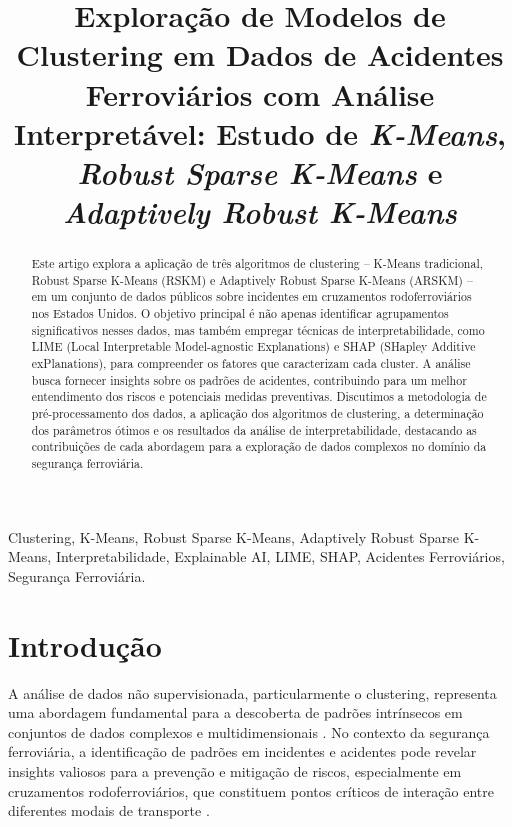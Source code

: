 \documentclass[conference]{IEEEtran}
\begin{document}
\title{Exploração de Modelos de Clustering em Dados de Acidentes Ferroviários com Análise Interpretável: Estudo de \textit{K-Means}, \textit{Robust Sparse K-Means} e \textit{Adaptively Robust K-Means}}

\author{
}

\maketitle

\begin{abstract}
Este artigo explora a aplicação de três algoritmos de clustering – K-Means tradicional, Robust Sparse K-Means (RSKM) e Adaptively Robust Sparse K-Means (ARSKM) – em um conjunto de dados públicos sobre incidentes em cruzamentos rodoferroviários nos Estados Unidos. O objetivo principal é não apenas identificar agrupamentos significativos nesses dados, mas também empregar técnicas de interpretabilidade, como LIME (Local Interpretable Model-agnostic Explanations) e SHAP (SHapley Additive exPlanations), para compreender os fatores que caracterizam cada cluster. A análise busca fornecer insights sobre os padrões de acidentes, contribuindo para um melhor entendimento dos riscos e potenciais medidas preventivas. Discutimos a metodologia de pré-processamento dos dados, a aplicação dos algoritmos de clustering, a determinação dos parâmetros ótimos e os resultados da análise de interpretabilidade, destacando as contribuições de cada abordagem para a exploração de dados complexos no domínio da segurança ferroviária.
\end{abstract}

\begin{IEEEkeywords}
Clustering, K-Means, Robust Sparse K-Means, Adaptively Robust Sparse K-Means, Interpretabilidade, Explainable AI, LIME, SHAP, Acidentes Ferroviários, Segurança Ferroviária.
\end{IEEEkeywords}

\section{Introdução}
A análise de dados não supervisionada, particularmente o clustering, representa uma abordagem fundamental para a descoberta de padrões intrínsecos em conjuntos de dados complexos e multidimensionais \cite{jain2010data}. No contexto da segurança ferroviária, a identificação de padrões em incidentes e acidentes pode revelar insights valiosos para a prevenção e mitigação de riscos, especialmente em cruzamentos rodoferroviários, que constituem pontos críticos de interação entre diferentes modais de transporte \cite{xu2015comprehensive}.
\end{document}
